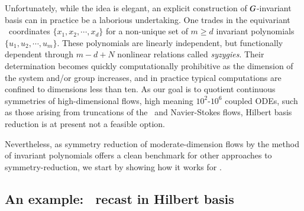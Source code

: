 \documentclass[preprint,number,sort&compress]{elsarticle}
\begin{document}
Unfortunately, while the idea is elegant, an explicit
construction of $G${-invariant} basis can in practice be
a laborious undertaking. One trades in the equivariant
\statesp\ coordinates $\{x_1,x_2,\cdots,x_d\}$ for a
non-unique set  of $m \geq d$ invariant polynomials
$\{u_1,u_2,\cdots,u_m\}$. These polynomials are linearly
independent, but functionally dependent through $m - d + N$
nonlinear relations called \emph{syzygies}. Their
determination becomes quickly computationally prohibitive as
the dimension of the system and/or group
increases, and in practice
typical computations are confined to dimensions less than
ten. As our goal is to quotient continuous symmetries of
high-dimensional flows, high meaning $10^2$-$10^6$ coupled
ODEs, such as those arising from truncations of the \KS\ and
Navier-Stokes flows, {Hilbert basis reduction} is
at present not a feasible option.

Nevertheless, as symmetry reduction of moderate-dimension
flows by the method of invariant polynomials offers a clean
benchmark for other approaches to symmetry-reduction, we start
by showing how it works for \cLf.


\subsection{\label{s:cLeHilbert} An example: \CLe\ recast in Hilbert basis}
\end{document}

